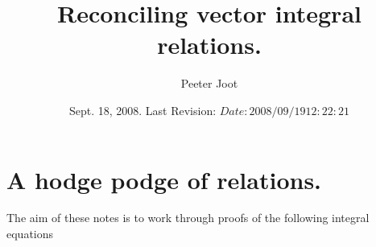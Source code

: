 \documentclass{article}
\title{ Reconciling vector integral relations. }
\author{Peeter Joot}
\date{ Sept. 18, 2008.  Last Revision: $Date: 2008/09/19 12:22:21 $ }
\begin{document}
\maketitle{}

\tableofcontents

\section{ A hodge podge of relations. }


The aim of these notes is to work through proofs of the following 
integral equations
\end{document}
